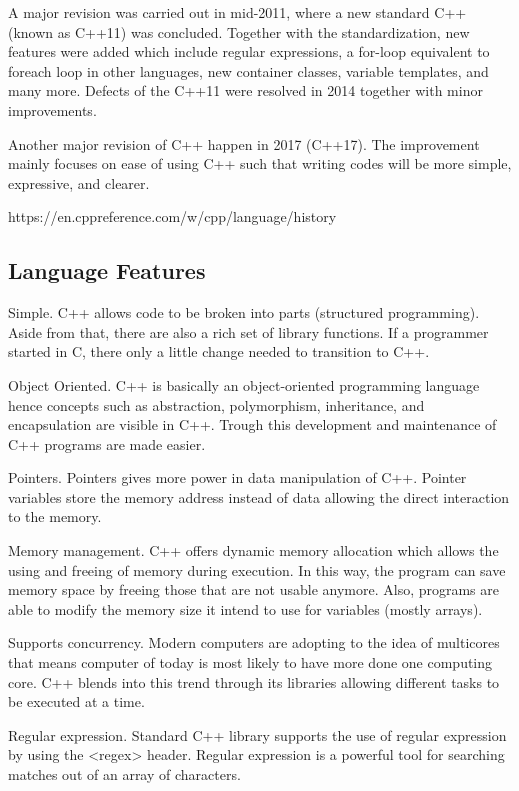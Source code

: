 \documentclass[a4paper, 12pt]{article}
\begin{document}
A major revision was carried out in  mid-2011, where a new standard C++ (known as C++11) was concluded. Together with the standardization, new features were added which include regular expressions, a for-loop equivalent to foreach loop in other languages, new container classes, variable templates, and many more. Defects of the C++11 were resolved in 2014 together with minor improvements. 

Another major revision of C++ happen in 2017 (C++17). The improvement mainly focuses on ease of using C++ such that writing codes will be more simple, expressive, and clearer. 

https://en.cppreference.com/w/cpp/language/history



\subsection{Language Features}

Simple. C++ allows code to be broken into parts (structured programming). Aside from that, there are also a rich set of library functions. If a programmer started in C, there only a little change needed to transition to C++. 

Object Oriented. C++ is basically an object-oriented programming language hence concepts such as abstraction, polymorphism, inheritance, and encapsulation are visible in C++. Trough this development and maintenance of C++ programs are made easier. 

Pointers. Pointers gives more power in data manipulation of C++. Pointer variables store the memory address instead of data allowing the direct interaction to the memory. 

Memory management. C++ offers dynamic memory allocation which allows the using and freeing of memory during execution. In this way, the program can save memory space by freeing those that are not usable anymore. Also, programs are able to modify the memory size it intend to use for variables (mostly arrays). 

Supports concurrency. Modern computers are adopting to the idea of multicores that means computer of today is most likely to have more done one computing core. C++ blends into this trend through its libraries allowing different tasks to be executed at a time. 

Regular expression. Standard C++ library supports the use of regular expression by using the <regex> header. Regular expression is a powerful tool for searching matches out of an array of characters.  
\end{document}
